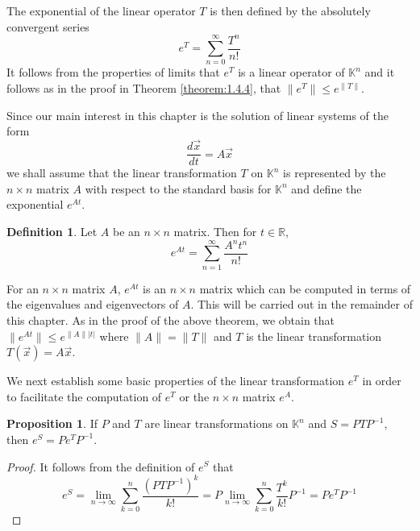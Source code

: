 \documentclass[11pt]{book}
\theoremstyle{definition}\newtheorem{definition}[subsection]{Definition}
\theoremstyle{definition}\newtheorem{example}[subsection]{Example}
\theoremstyle{definition}\newtheorem{notation}[subsection]{Notation}
\theoremstyle{definition}\newtheorem{remark}[subsection]{Remark}
\theoremstyle{theorem}\newtheorem{theorem}[subsection]{Theorem}
\theoremstyle{theorem}\newtheorem{lemma}[subsection]{Lemma}
\theoremstyle{theorem}\newtheorem{proposition}[subsection]{Proposition}
\theoremstyle{theorem}\newtheorem{corollary}[subsection]{Corollary}
\theoremstyle{theorem}\newtheorem{case}{Case}
\theoremstyle{remark}\newtheorem{subcase}{Subcase}[case]
\newcommand{\K}{\mathbb{K}}
\newcommand{\R}{\mathbb{R}}
\begin{document}
The exponential of the linear operator $T$ is then defined by the absolutely convergent series 
\begin{equation*}
    e^T = \sum_{n = 0}^{\infty} \frac{T^n}{n!}
\end{equation*}
It follows from the properties of limits that $e^T$ is a linear operator of $\K^n$ and it follows as in the proof in Theorem \ref{theorem:1.4.4}, that $\|e^T\| \leq e^{\|T\|}$.

Since our main interest in this chapter is the solution of linear systems of the form
\begin{equation*}
    \frac{d\vec{x}}{dt} = A\vec{x}
\end{equation*}
we shall assume that the linear transformation $T$ on $\K^n$ is represented by the $n \times n$ matrix $A$ with respect to the standard basis for $\K^n$ and define the exponential $e^{At}$.

\begin{definition}\label{definition:1.4.5}
    Let $A$ be an $n \times n$ matrix. Then for $t \in \R$, 
    \begin{equation*}
        e^{At} = \sum_{n = 1}^{\infty} \frac{A^n t^n}{n!}
    \end{equation*}
\end{definition}

For an $n \times n$ matrix $A$, $e^{At}$ is an $n \times n$ matrix which can be computed in terms of the eigenvalues and eigenvectors of $A$. This will be carried out in the remainder of this chapter. As in the proof of the above theorem, we obtain that $\|e^{At}\| \leq e^{\|A\||t|}$ where $\|A\| = \|T\|$ and $T$ is the linear transformation $T(\vec{x}) = A\vec{x}$.

We next establish some basic properties of the linear transformation $e^T$ in order to facilitate the computation of $e^T$ or the $n \times n$ matrix $e^A$.

\begin{proposition}\label{proposition:1.4.6}
    If $P$ and $T$ are linear transformations on $\K^n$ and $S = PTP^{-1}$, then $e^S = Pe^TP^{-1}$.
\end{proposition}

\begin{proof}
    It follows from the definition of $e^S$ that
    \begin{equation*}
        e^S = \lim_{n \to \infty} \sum_{k = 0}^{n} \frac{(PTP^{-1})^k}{k!} = P\lim_{n \to \infty} \sum_{k = 0}^{n} \frac{T^k}{k!}P^{-1} = Pe^TP^{-1}
    \end{equation*}
\end{proof}
\end{document}

